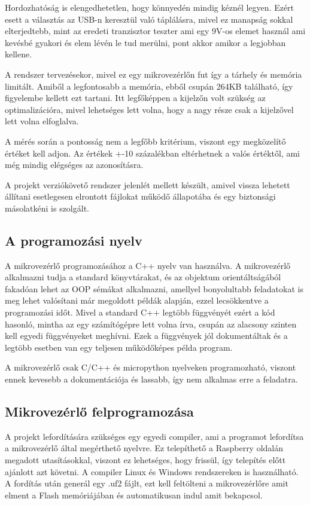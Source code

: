 Hordozhatóság is elengedhetetlen, hogy könnyedén mindig kéznél legyen.
Ezért esett a választás az USB-n keresztül való táplálásra, mivel ez 
manapság sokkal elterjedtebb, mint az eredeti tranzisztor teszter ami egy
9V-os elemet használ ami kevésbé gyakori és elem lévén le tud merülni, pont 
akkor amikor a legjobban kellene.

A rendszer tervezésekor, mivel ez egy mikrovezérlőn fut így a 
tárhely és memória limitált. Amiből a legfontosabb a memória, ebből 
csupán 264KB található, így figyelembe kellett ezt tartani. Itt 
legfőképpen a kijelzőn volt szükség az optimalizációra, mivel 
lehetséges lett volna, hogy a nagy része csak a kijelzővel lett volna elfoglalva.

A mérés során a pontosság nem a legfőbb kritérium, viszont egy megközelítő
értéket kell adjon. Az értékek +-10 százalékban eltérhetnek a valós értéktől, 
ami még mindig elégséges az azonosításra. 

A projekt verziókövető rendszer jelenlét mellett készült, amivel
vissza lehetett állítani esetlegesen elrontott fájlokat működő állapotába
és egy biztonsági másolatkéni is szolgált.


\subsection{A programozási nyelv}

A mikrovezérlő programozásához a C++ nyelv van használva. A mikrovezérlő alkalmazni 
tudja a standard könyvtárakat, és az objektum orientáltságából fakadóan lehet az 
OOP sémákat alkalmazni, amellyel bonyolultabb feladatokat is meg lehet valósítani
már megoldott példák alapján, ezzel lecsökkentve a programozási időt.
Mivel a standard C++ legtöbb függvényét ezért a kód hasonló, mintha az egy számítógépre
lett volna írva, csupán az alacsony szinten kell egyedi függvényeket meghívni.
Ezek a függvények jól dokumentáltak és a legtöbb esetben van egy teljesen működőképes
példa program.

A mikrovezérlő csak C/C++ és micropython nyelveken programozható, viszont ennek
kevesebb a dokumentációja és lassabb, így nem alkalmas erre a feladatra.


\subsection{Mikrovezérlő felprogramozása}

A projekt lefordítására szükséges egy egyedi compiler, ami a programot lefordítsa
a mikrovezérlő által megérthető nyelvre. Ez telepíthető a Raspberry oldalán megadott 
utasításokkal, viszont ez lehetséges, hogy frissül, így telepítés előtt ajánlott
azt követni. A compiler Linux és Windows rendszereken is használható. A fordítás után
generál egy .uf2 fájlt, ezt kell feltölteni a mikrovezérlőre amit elment a Flash
memóriájában és automatikusan indul amit bekapcsol.

